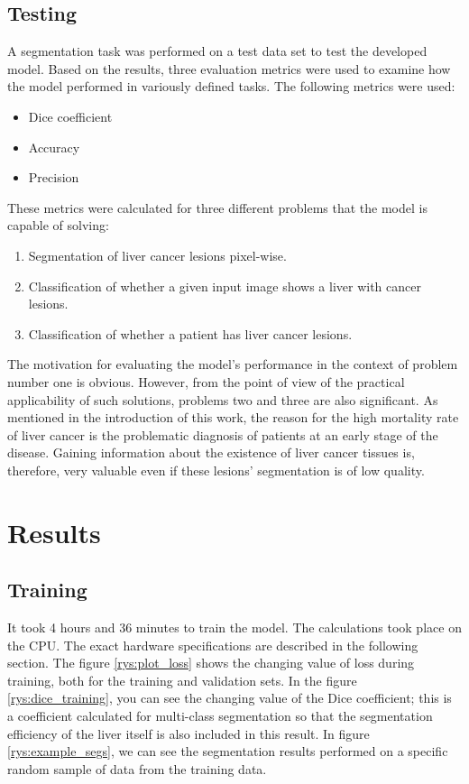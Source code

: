 \subsection{Testing}
A segmentation task was performed on a test data set to test the developed model. Based on the results, three evaluation metrics were used to examine how the model performed in variously defined tasks. The following metrics were used:
\begin{itemize}
    \item Dice coefficient
    \item Accuracy
    \item Precision
\end{itemize}
\label{model_testing}
These metrics were calculated for three different problems that the model is capable of solving:
\begin{enumerate}
    \item Segmentation of liver cancer lesions pixel-wise.
    \item Classification of whether a given input image shows a liver with cancer lesions.
    \item Classification of whether a patient has liver cancer lesions.
\end{enumerate}
The motivation for evaluating the model's performance in the context of problem number one is obvious. However, from the point of view of the practical applicability of such solutions, problems two and three are also significant. As mentioned in the introduction of this work, the reason for the high mortality rate of liver cancer is the problematic diagnosis of patients at an early stage of the disease. Gaining information about the existence of liver cancer tissues is, therefore, very valuable even if these lesions' segmentation is of low quality.
\section{Results}

\subsection{Training}

It took 4 hours and 36 minutes to train the model. The calculations took place on the CPU. The exact hardware specifications are described in the following section. The figure \ref{rys:plot_loss} shows the changing value of loss during training, both for the training and validation sets. In the figure \ref{rys:dice_training}, you can see the changing value of the Dice coefficient; this is a coefficient calculated for multi-class segmentation so that the segmentation efficiency of the liver itself is also included in this result. In figure \ref{rys:example_segs}, we can see the segmentation results performed on a specific random sample of data from the training data.



